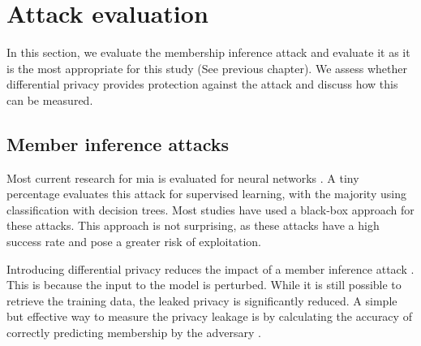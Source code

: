 




\section{Attack evaluation} \label{theory:attack-evaluation}
In this section, we evaluate the membership inference attack and evaluate it as it is the most appropriate for this study (See previous chapter).
We assess whether differential privacy provides protection against the attack and discuss how this can be measured.
\subsection{Member inference attacks}
Most current research for \gls{mia} is evaluated for neural networks \citep{rigaki_survey_2021}.
A tiny percentage evaluates this attack for supervised learning, with the majority using classification with decision trees.
Most studies have used a black-box approach \citep{rigaki_survey_2021} for these attacks.
This approach is not surprising, as these attacks have a high success rate and pose a greater risk of exploitation.

Introducing differential privacy reduces the impact of a member inference attack \citep{rigaki_survey_2021,hu_membership_2022}.
This is because the input to the model is perturbed.
While it is still possible to retrieve the training data, the leaked privacy is significantly reduced.
A simple but effective way to measure the privacy leakage is by calculating the accuracy of correctly predicting membership by the adversary \citep{choquette-choo_label-only_2021}.

